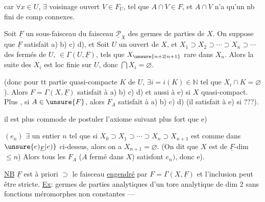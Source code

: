  car $\forall x\in U$, $\exists$ voisinage ouvert $V\in F_U$, tel que $A\cap V\in F$, et $A\cap V$ n'a qu'un nb fini de comp connexes.


Soit $\underline F$ un sous-faisceau du faisceau $\underline{\mathcal P}_X$ des germes de parties de $X$. On suppose que $\underline F$ satisfait a) b) c) d), et   Soit $U$ un ouvert de $X$, et $X_1\supset X_2\supset\cdots\supset X_n\supset\cdots$ des fermés de $U$, $\in\Gamma(U,\underline F)$, tels que $X_{\unsure{n+2|n+1}}$ rare dans $X_n$. Alors la suite des $X_i$ est loc finie sur $U$, donc $\bigcap X_i=\varnothing$.

(donc pour tt partie quasi-compacte $K$ de $U$, $\exists i=i(K)\in\mathbb N$ tel que $X_i\cap K=\varnothing$). Alors $F=\Gamma(X,\underline F)$ satisfait à a) b) c) d)  et aussi à e) si $X$ quasi-compact. Plus , si $A\in\unsure{F}$, alors $F_A$  satisfait à a) b) c) d)  (il satisfait à e) si ???).

 il est plus commode de postuler l'axiome suivant plus fort que e)

$(e_n)$ $\exists$ un entier $n$ tel que si  $X_0\supset X_1\supset\cdots\supset X_n\supset X_{n+1}$ est comme dans $\unsure{e)_{\underline F}|e)}$ ci-dessus, alors on a $X_{n+1}=\varnothing$. (On dit que $X$ est de $\underline F$-dim $\leq n$)
Alors tous les $F_A$ ($A$  fermé dans $X$) satisfont  $e_n)$, donc e).

\uline{NB} $\underline F$ est à priori $\supset$ le faisceau \uline{engendré} par $F=\Gamma(X,\underline F)$ et l'inclusion peut être stricte. \uline{Ex}: germes de parties analytiques d'un tore analytique de dim 2 sans fonctions méromorphes non constantes ---

